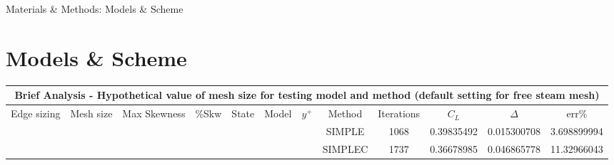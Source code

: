 \documentclass[english,10pt,a4paper,twoside]{beamer}
\newcommand{\ra}[1]{\renewcommand{\arraystretch}{#1}} %
\begin{document}
	\begin{frame}[shrink=55]{Materials \& Methods: Models \& Scheme}
		\section{Models \& Scheme}
		\begin{landscape}
			\begin{table}[H]
				\ra{1.5}
				\centering
				\begin{tabular}{|cccccccccccc|}
					\hline
					\multicolumn{12}{|c|}{\textbf{Brief Analysis - Hypothetical value of mesh size for testing  model and method (default setting for free steam mesh)}}                                                                                                                                                                                                                                                                                                                                                                                        \\ \hline
					\multicolumn{1}{|c|}{Edge sizing}               & \multicolumn{1}{c|}{Mesh size}              & \multicolumn{1}{c|}{Max Skewness}           & \multicolumn{1}{c|}{\%Skw}                  & \multicolumn{1}{c|}{State}                     & \multicolumn{1}{c|}{Model}                                                                & \multicolumn{1}{c|}{$y^+$}                 & \multicolumn{1}{c|}{Method}                          & \multicolumn{1}{c|}{Iterations} & \multicolumn{1}{c|}{$C_L$}      & \multicolumn{1}{c|}{$\Delta$}    & err\%                               \\ \hline
					\multicolumn{1}{|c|}{}                          & \multicolumn{1}{c|}{}                       & \multicolumn{1}{c|}{}                       & \multicolumn{1}{c|}{}                       & \multicolumn{1}{c|}{}                          & \multicolumn{1}{c|}{\cellcolor[HTML]{96FFFB}}                                             & \multicolumn{1}{c|}{}                      & \multicolumn{1}{c|}{\cellcolor[HTML]{FFCE93}SIMPLE}  & \multicolumn{1}{c|}{1068}       & \multicolumn{1}{c|}{0.39835492} & \multicolumn{1}{c|}{0.015300708} & 3.698899994                         \\ \cline{8-12} 
					\multicolumn{1}{|c|}{}                          & \multicolumn{1}{c|}{}                       & \multicolumn{1}{c|}{}                       & \multicolumn{1}{c|}{}                       & \multicolumn{1}{c|}{}                          & \multicolumn{1}{c|}{\cellcolor[HTML]{96FFFB}}                                             & \multicolumn{1}{c|}{}                      & \multicolumn{1}{c|}{\cellcolor[HTML]{FE996B}SIMPLEC} & \multicolumn{1}{c|}{1737}       & \multicolumn{1}{c|}{0.36678985} & \multicolumn{1}{c|}{0.046865778} & 11.32966043                         \\ \cline{8-12} 

\end{tabular}
\end{table}
\end{landscape}
\end{frame}
\end{document}
